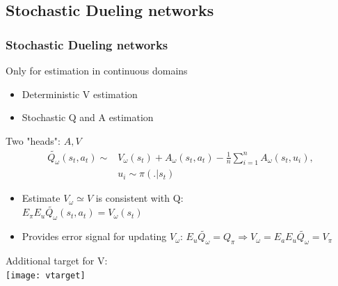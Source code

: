 \documentclass{beamer}
\begin{document}
\subsection{Stochastic Dueling networks}
\begin{frame}
\frametitle{Stochastic Dueling networks}
Only for estimation in continuous domains
\begin{itemize}
\item Deterministic V estimation
\item Stochastic Q and A estimation
\end{itemize}

\vspace{3mm}
Two "heads": $A, V$
\begin{align*}
\tilde{Q_\omega} (s_t, a_t) \sim & V_\omega (s_t) + A_\omega(s_t, a_t) - \frac{1}{n} \sum_{i=1}^n A_\omega (s_t, u_i),\\ & u_i \sim \pi(.|s_t)
\end{align*}

\begin{itemize}
\item Estimate $V_\omega \simeq V$ is consistent with Q: \\
$E_\pi E_u \tilde{Q_\omega} (s_t, a_t) = V_\omega (s_t)$\\
\item Provides error signal for updating $V_\omega$: $E_u \tilde{Q_\omega} = Q_\pi \Rightarrow V_\omega = E_a E_u \tilde{Q_\omega} = V_\pi$
\end{itemize}

\end{frame}

\begin{frame}
Additional target for V:\\
\texttt{[image: vtarget]}
\end{frame}
\end{document}
